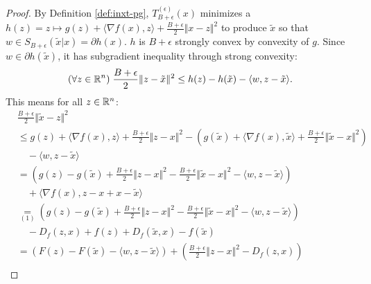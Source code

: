 \documentclass[12pt]{article}
\begin{document}
    \begin{proof}
        By Definition \ref{def:inxt-pg}, $T_{B + \epsilon}^{(\epsilon)}(x)$ minimizes a $h(z) = z \mapsto g(z) + \langle \nabla f(x), z \rangle + \frac{B + \epsilon}{2}\Vert x - z\Vert^2$ to produce $\tilde x$ so that $w \in S_{B + \epsilon}(\tilde x| x) = \partial h(x)$. 
        $h$ is $B + \epsilon$ strongly convex by convexity of $g$. 
        Since $w \in \partial h(\tilde x)$, it has subgradient inequality through strong convexity: 
        $$
            (\forall z \in \mathbb R^n)\;  
            \frac{B + \epsilon}{2}\Vert z - \tilde x\Vert^2 \le h(z) - h(\tilde x) - \langle w,  z - \tilde x\rangle. 
        $$
        This means for all $z \in \mathbb R^n$: 
        \begin{align*}
            &\frac{B + \epsilon}{2}\Vert \tilde x - z \Vert^2 
            \\
            &\le 
            g(z) + \langle \nabla f(x), z\rangle + \frac{B + \epsilon}{2}\Vert z - x\Vert^2
            - \left(
                g(\tilde x) + 
                \langle \nabla f(x), \tilde x\rangle
                + 
                \frac{B + \epsilon}{2}\Vert \tilde x - x\Vert^2
            \right)
                \\ &\quad 
                - \langle w, z - \tilde x\rangle
            \\
            &= 
            \left(
                g(z) - g(\tilde x)
                + \frac{B + \epsilon}{2}\Vert z - x\Vert^2 - \frac{B + \epsilon}{2}\Vert \tilde x - x\Vert^2
                - \langle w, z - \tilde x\rangle
            \right)
            \\&\quad 
                + \langle \nabla f(x), z - x + x -\tilde x\rangle
            \\
            &\underset{(1)}{=} 
            \left(
                g(z) - g(\tilde x)
                + \frac{B + \epsilon}{2}\Vert z - x\Vert^2 - \frac{B + \epsilon}{2}\Vert \tilde x - x\Vert^2
                - \langle w, z - \tilde x\rangle
            \right)
                \\
                &\quad 
                - D_f(z, x) + f(z)
                + D_f(\tilde x, x) - f(\tilde x)
            \\
            &=
            \left(
                F(z) - F(\tilde x)
                - \langle w, z - \tilde x\rangle
            \right)
            + 
            \left(
                \frac{B + \epsilon}{2}\Vert z - x\Vert^2 - D_f(z, x)
            \right) 
                \\ &\quad 

\end{align*}
\end{proof}
\end{document}
